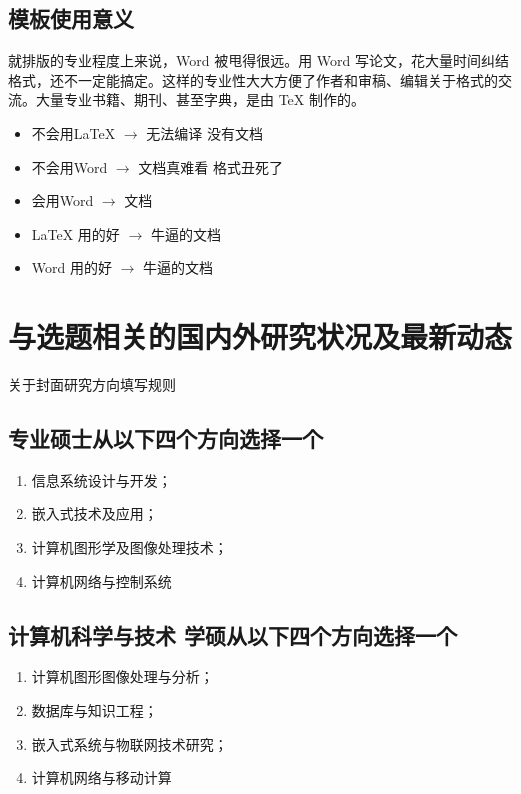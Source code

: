 \begin{framedbox}
\subsection{模板使用意义}
就排版的专业程度上来说，Word 被甩得很远。用 Word 写论文，花大量时间纠结格式，还不一定能搞定。这样的专业性大大方便了作者和审稿、编辑关于格式的交流。大量专业书籍、期刊、甚至字典，是由 TeX 制作的。

\begin{itemize}
	\item 不会用\LaTeX{} $\rightarrow$ 无法编译 没有文档
	\item 不会用Word $\rightarrow$ 文档真难看 格式丑死了
	\item 会用Word $\rightarrow$  文档
	\item \LaTeX{} 用的好 $\rightarrow$  牛逼的文档
	\item Word 用的好 $\rightarrow$  牛逼的文档
\end{itemize}

\newpage 
\section{与选题相关的国内外研究状况及最新动态} 
\NMUtableline 

\begin{center}
	关于封面研究方向填写规则
\end{center}

\subsection{专业硕士从以下四个方向选择一个}

\begin{enumerate}[label=\arabic*)]
	\item 信息系统设计与开发；
	\item 嵌入式技术及应用；
	\item 计算机图形学及图像处理技术；	
	\item 计算机网络与控制系统
\end{enumerate}

\subsection{计算机科学与技术 学硕从以下四个方向选择一个}

\begin{enumerate}[label=\arabic*)]
	\item 计算机图形图像处理与分析；
	\item 数据库与知识工程；
	\item 嵌入式系统与物联网技术研究；	
	\item 计算机网络与移动计算
\end{enumerate}


\end{framedbox}
